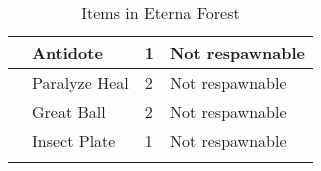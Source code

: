 \begin{longtable}{|| l l l l ||}%
\hline%
&Antidote&1&Not respawnable\\%
\hline%
&Paralyze Heal&2&Not respawnable\\%
\hline%
&Great Ball&2&Not respawnable\\%
\hline%
&Insect Plate&1&Not respawnable\\%
\hline%
\endhead%
\hline%
\caption{Items in Eterna Forest}%
\label{tab:EternaForestItems}%
\end{longtable}